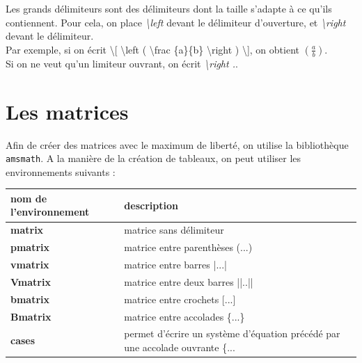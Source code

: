 \documentclass[a4paper, 10pt]{book}
\begin{document}
\vspace{0.5 cm}

Les grands délimiteurs sont des délimiteurs dont la taille s'adapte à ce qu'ils contiennent. Pour cela, on place \textit{\textbackslash left} devant le délimiteur d'ouverture, et \textit{\textbackslash right} devant le délimiteur. \\

Par exemple, si on écrit \textsf{\textbackslash[ \textbackslash left ( \textbackslash frac \{a\}\{b\} \textbackslash right ) \textbackslash]}, 
on obtient $ \left ( \frac{a}{b} \right ) $.\\

\vspace{0.3 cm}
Si on ne veut qu'un limiteur ouvrant, on écrit \textit{\textbackslash right .}.  

\vspace{0.8 cm}
\section{Les matrices}
\vspace{0.5 cm}

Afin de créer des matrices avec le maximum de liberté, on utilise la bibliothèque \texttt{amsmath}. A la manière de la création de tableaux, on peut utiliser les environnements suivants : \\

\vspace{0.5 cm}
\begin{table}[h]
    \centering
    \begin{tabular}{|| m{2cm} | m{7cm} ||}
        \hline \hline
        \textbf{nom de l'environnement}& \textbf{description}  \\
        \hline \hline
        \textbf{matrix} & matrice sans délimiteur \\
        \hline
        \textbf{pmatrix} & matrice entre parenthèses (...)\\
        \hline
        \textbf{vmatrix} & matrice entre barres |...| \\
        \hline
        \textbf{Vmatrix} & matrice entre deux barres ||..||\\
        \hline 
        \textbf{bmatrix} & matrice entre crochets [...] \\
        \hline 
        \textbf{Bmatrix} & matrice entre accolades \{...\} \\
        \hline 
        \textbf{cases} & permet d'écrire un système d'équation précédé par une accolade ouvrante \{... \\
        \hline \hline 
    \end{tabular}
\end{table}
\vspace{0.5 cm}
\end{document}
